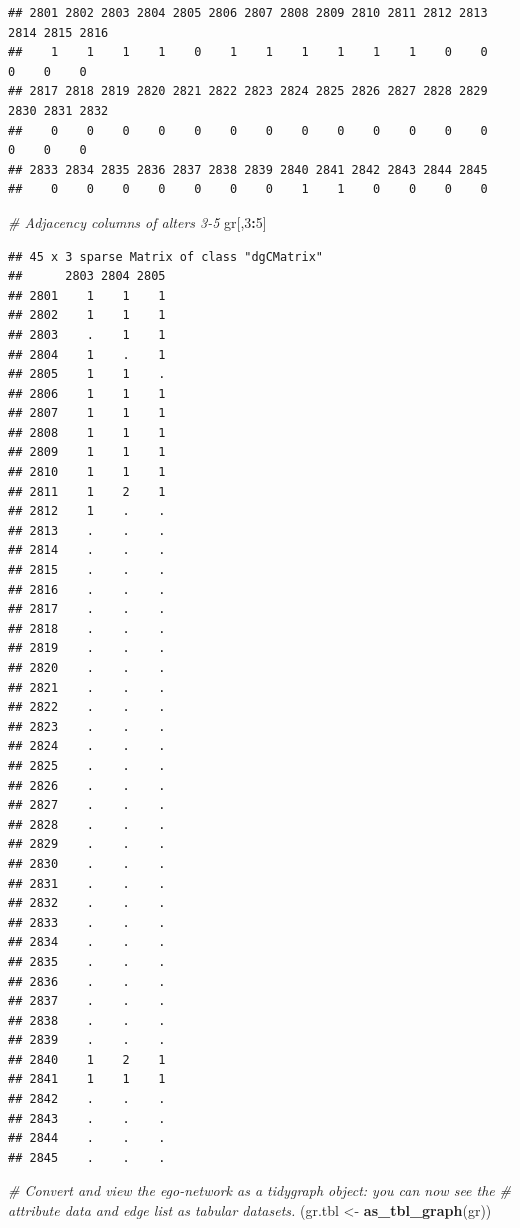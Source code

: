 \documentclass[
]{book}
\newenvironment{Shaded}{\begin{snugshade}}{\end{snugshade}}
\newcommand{\CommentTok}[1]{\textcolor[rgb]{0.56,0.35,0.01}{\textit{#1}}}
\newcommand{\DecValTok}[1]{\textcolor[rgb]{0.00,0.00,0.81}{#1}}
\newcommand{\FunctionTok}[1]{\textcolor[rgb]{0.13,0.29,0.53}{\textbf{#1}}}
\newcommand{\NormalTok}[1]{#1}
\newcommand{\OtherTok}[1]{\textcolor[rgb]{0.56,0.35,0.01}{#1}}
\newcommand{\SpecialCharTok}[1]{\textcolor[rgb]{0.81,0.36,0.00}{\textbf{#1}}}
\begin{document}
\begin{verbatim}
## 2801 2802 2803 2804 2805 2806 2807 2808 2809 2810 2811 2812 2813 2814 2815 2816 
##    1    1    1    1    0    1    1    1    1    1    1    0    0    0    0    0 
## 2817 2818 2819 2820 2821 2822 2823 2824 2825 2826 2827 2828 2829 2830 2831 2832 
##    0    0    0    0    0    0    0    0    0    0    0    0    0    0    0    0 
## 2833 2834 2835 2836 2837 2838 2839 2840 2841 2842 2843 2844 2845 
##    0    0    0    0    0    0    0    1    1    0    0    0    0
\end{verbatim}

\begin{Shaded}
\begin{Highlighting}[]
\CommentTok{\# Adjacency columns of alters 3{-}5}
\NormalTok{gr[,}\DecValTok{3}\SpecialCharTok{:}\DecValTok{5}\NormalTok{]}
\end{Highlighting}
\end{Shaded}

\begin{verbatim}
## 45 x 3 sparse Matrix of class "dgCMatrix"
##      2803 2804 2805
## 2801    1    1    1
## 2802    1    1    1
## 2803    .    1    1
## 2804    1    .    1
## 2805    1    1    .
## 2806    1    1    1
## 2807    1    1    1
## 2808    1    1    1
## 2809    1    1    1
## 2810    1    1    1
## 2811    1    2    1
## 2812    1    .    .
## 2813    .    .    .
## 2814    .    .    .
## 2815    .    .    .
## 2816    .    .    .
## 2817    .    .    .
## 2818    .    .    .
## 2819    .    .    .
## 2820    .    .    .
## 2821    .    .    .
## 2822    .    .    .
## 2823    .    .    .
## 2824    .    .    .
## 2825    .    .    .
## 2826    .    .    .
## 2827    .    .    .
## 2828    .    .    .
## 2829    .    .    .
## 2830    .    .    .
## 2831    .    .    .
## 2832    .    .    .
## 2833    .    .    .
## 2834    .    .    .
## 2835    .    .    .
## 2836    .    .    .
## 2837    .    .    .
## 2838    .    .    .
## 2839    .    .    .
## 2840    1    2    1
## 2841    1    1    1
## 2842    .    .    .
## 2843    .    .    .
## 2844    .    .    .
## 2845    .    .    .
\end{verbatim}

\begin{Shaded}
\begin{Highlighting}[]
\CommentTok{\# Convert and view the ego{-}network as a tidygraph object: you can now see the }
\CommentTok{\# attribute data and edge list as tabular datasets.}
\NormalTok{(gr.tbl }\OtherTok{\textless{}{-}} \FunctionTok{as\_tbl\_graph}\NormalTok{(gr))}
\end{Highlighting}
\end{Shaded}
\end{document}
